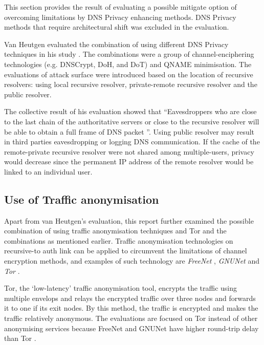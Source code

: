 This section provides the result of evaluating a possible mitigate option of overcoming limitations by DNS Privacy enhancing methods.
DNS Privacy methods that require architectural shift was excluded in the evaluation.

Van Heutgen evaluated the combination of using different DNS Privacy techniques in his study \cite{van2018privacy}.
The combinations were a group of channel-enciphering technologies (e.g. DNSCrypt, DoH, and DoT) and QNAME minimisation.
The evaluations of attack surface were introduced based on the location of recursive resolvers: using local recursive resolver, private-remote recursive resolver and the public resolver.

The collective result of his evaluation showed that ``Eavesdroppers who are close to the last chain of the authoritative servers or close to the recursive resolver will be able to obtain a full frame of DNS packet \cite{van2018privacy}''.
Using public resolver may result in third parties eavesdropping or logging DNS communication.
If the cache of the remote-private recursive resolver were not shared among multiple-users, privacy would decrease since the permanent IP address of the remote resolver would be linked to an individual user.

\subsection{Use of Traffic anonymisation}
Apart from van Heutgen’s evaluation, this report further examined the possible combination of using traffic anonymisation techniques and Tor and the combinations as mentioned earlier.
Traffic anonymisation technologies on recursive-to auth link can be applied to circumvent the limitations of channel encryption methods, and examples of such technology are \textit{FreeNet} \cite{clarke2001freenet}, \textit{GNUNet} \cite{grothoff2017gnunet} and \textit{Tor} \cite{dingledine2004tor}.

Tor, the `low-latency' traffic anonymisation tool, encrypts the traffic using multiple envelops and relays the encrypted traffic over three nodes and forwards it to one if its exit nodes.
By this method, the traffic is encrypted and makes the traffic relatively anonymous.
The evaluations are focused on Tor instead of other anonymising services because FreeNet and GNUNet have higher round-trip delay than Tor \cite{anonymousoverdns}.

